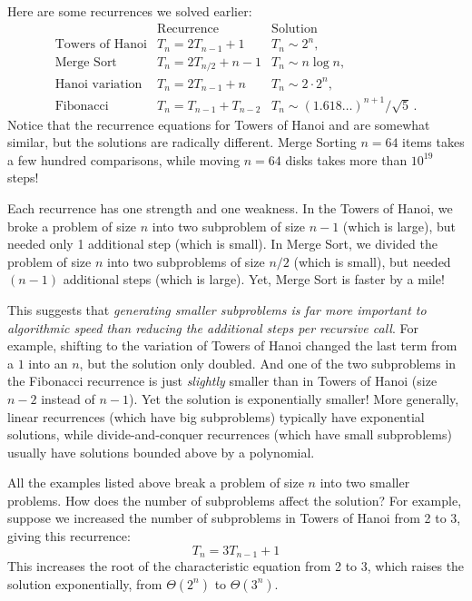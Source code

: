 Here are some recurrences we solved earlier:
\[
\begin{array}{rll}
& \text{Recurrence} & \text{Solution} \\
\text{Towers of Hanoi} & T_n = 2 T_{n-1} + 1 & T_n \sim 2^n, \\
\text{Merge Sort} & T_n = 2 T_{n/2} + n - 1 & T_n \sim n \log n, \\
\text{Hanoi variation} & T_n = 2 T_{n-1} + n & T_n \sim 2 \cdot 2^n, \\
\text{Fibonacci} & T_n = T_{n-1} + T_{n-2} & T_n \sim
(1.618\ldots)^{n+1} / \sqrt{5}\, .
\end{array}
\]
Notice that the recurrence equations for Towers of Hanoi and  are somewhat similar, but the
solutions are radically different.  Merge Sorting $n = 64$ items takes
a few hundred comparisons, while moving $n = 64$ disks takes more than
$10^{19}$ steps!

Each recurrence has one strength and one weakness.  In the Towers of
Hanoi, we broke a problem of size $n$ into two subproblem of size $n -
1$ (which is large), but needed only 1 additional step (which is
small).  In Merge Sort, we divided the problem of size $n$ into two
subproblems of size $n/2$ (which is small), but needed $(n - 1)$
additional steps (which is large).  Yet, Merge Sort is faster by a
mile!

This suggests that \emph{generating smaller subproblems is far more
  important to algorithmic speed than reducing the additional steps
  per recursive call}.  For example, shifting to the variation of
Towers of Hanoi changed the last term from a $1$ into an $n$, but the
solution only doubled.  And one of the two subproblems in the
Fibonacci recurrence is just \emph{slightly} smaller than in Towers of
Hanoi (size $n -2$ instead of $n-1$).  Yet the solution is
exponentially smaller!  More generally, linear recurrences (which have
big subproblems) typically have exponential solutions, while
divide-and-conquer recurrences (which have small subproblems) usually
have solutions bounded above by a polynomial.

All the examples listed above break a problem of size $n$ into two
smaller problems.  How does the number of subproblems affect the
solution?  For example, suppose we increased the number of subproblems
in Towers of Hanoi from 2 to 3, giving this recurrence:
\begin{equation*}
T_n = 3 T_{n-1} + 1
\end{equation*}
This increases the root of the characteristic equation from 2 to 3,
which raises the solution exponentially, from $\Theta(2^n)$ to
$\Theta(3^n)$.

